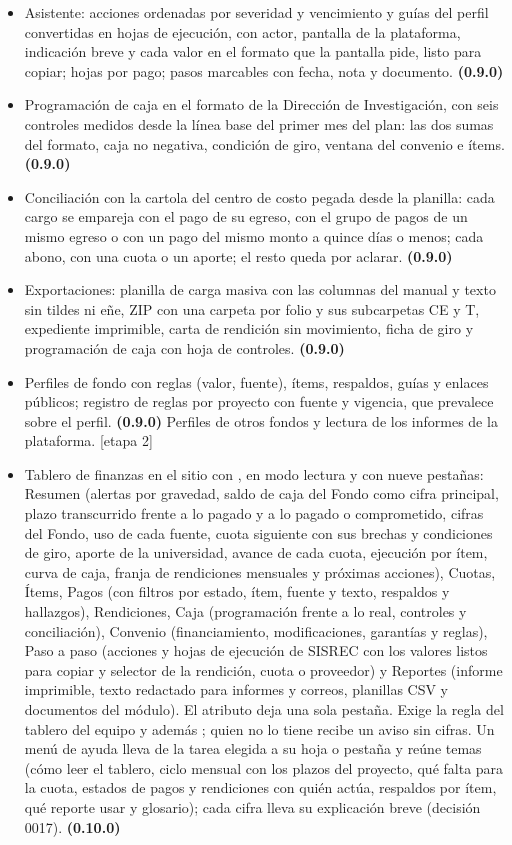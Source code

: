 \documentclass[11pt,a4paper]{article}
\newcommand{\etapa}[1]{\textcolor{grismedio}{[etapa #1]}}
\begin{document}
\begin{itemize}
\item Asistente: acciones ordenadas por severidad y vencimiento y guías del perfil convertidas en hojas de ejecución, con actor, pantalla de la plataforma, indicación breve y cada valor en el formato que la pantalla pide, listo para copiar; hojas por pago; pasos marcables con fecha, nota y documento. \textbf{(0.9.0)}
\item Programación de caja en el formato de la Dirección de Investigación, con seis controles medidos desde la línea base del primer mes del plan: las dos sumas del formato, caja no negativa, condición de giro, ventana del convenio e ítems. \textbf{(0.9.0)}
\item Conciliación con la cartola del centro de costo pegada desde la planilla: cada cargo se empareja con el pago de su egreso, con el grupo de pagos de un mismo egreso o con un pago del mismo monto a quince días o menos; cada abono, con una cuota o un aporte; el resto queda por aclarar. \textbf{(0.9.0)}
\item Exportaciones: planilla de carga masiva con las columnas del manual y texto sin tildes ni eñe, ZIP con una carpeta por folio y sus subcarpetas CE y T, expediente imprimible, carta de rendición sin movimiento, ficha de giro y programación de caja con hoja de controles. \textbf{(0.9.0)}
\item Perfiles de fondo con reglas (valor, fuente), ítems, respaldos, guías y enlaces públicos; registro de reglas por proyecto con fuente y vigencia, que prevalece sobre el perfil. \textbf{(0.9.0)} Perfiles de otros fondos y lectura de los informes de la plataforma. \etapa{2}
\item Tablero de finanzas en el sitio con \codigo{[gdp_finanzas proyecto="CODIGO"]}, en modo lectura y con nueve pestañas: Resumen (alertas por gravedad, saldo de caja del Fondo como cifra principal, plazo transcurrido frente a lo pagado y a lo pagado o comprometido, cifras del Fondo, uso de cada fuente, cuota siguiente con sus brechas y condiciones de giro, aporte de la universidad, avance de cada cuota, ejecución por ítem, curva de caja, franja de rendiciones mensuales y próximas acciones), Cuotas, Ítems, Pagos (con filtros por estado, ítem, fuente y texto, respaldos y hallazgos), Rendiciones, Caja (programación frente a lo real, controles y conciliación), Convenio (financiamiento, modificaciones, garantías y reglas), Paso a paso (acciones y hojas de ejecución de SISREC con los valores listos para copiar y selector de la rendición, cuota o proveedor) y Reportes (informe imprimible, texto redactado para informes y correos, planillas CSV y documentos del módulo). El atributo  deja una sola pestaña. Exige la regla del tablero del equipo y además ; quien no lo tiene recibe un aviso sin cifras. Un menú de ayuda lleva de la tarea elegida a su hoja o pestaña y reúne temas (cómo leer el tablero, ciclo mensual con los plazos del proyecto, qué falta para la cuota, estados de pagos y rendiciones con quién actúa, respaldos por ítem, qué reporte usar y glosario); cada cifra lleva su explicación breve (decisión 0017). \textbf{(0.10.0)}

\end{itemize}
\end{document}

